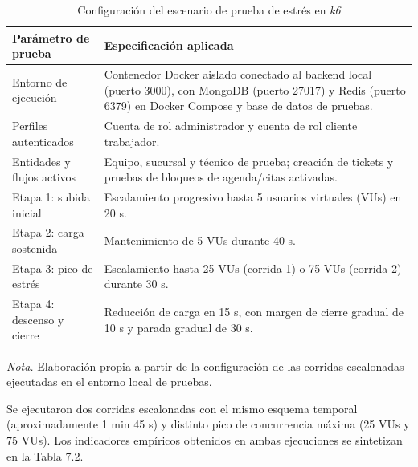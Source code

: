 \begin{table}[htbp]
\centering
\caption{Configuración del escenario de prueba de estrés en \textit{k6}}
\label{tab:config-k6}
\begin{tabularx}{\textwidth}{>{\raggedright\arraybackslash}p{4.2cm} X}
\toprule
\textbf{Parámetro de prueba} & \textbf{Especificación aplicada} \\
\midrule
Entorno de ejecución & Contenedor Docker aislado conectado al backend local (puerto 3000), con MongoDB (puerto 27017) y Redis (puerto 6379) en Docker Compose y base de datos de pruebas. \\
Perfiles autenticados & Cuenta de rol administrador y cuenta de rol cliente trabajador. \\
Entidades y flujos activos & Equipo, sucursal y técnico de prueba; creación de tickets y pruebas de bloqueos de agenda/citas activadas. \\
Etapa 1: subida inicial & Escalamiento progresivo hasta 5 usuarios virtuales (VUs) en 20 s. \\
Etapa 2: carga sostenida & Mantenimiento de 5 VUs durante 40 s. \\
Etapa 3: pico de estrés & Escalamiento hasta 25 VUs (corrida 1) o 75 VUs (corrida 2) durante 30 s. \\
Etapa 4: descenso y cierre & Reducción de carga en 15 s, con margen de cierre gradual de 10 s y parada gradual de 30 s. \\
\bottomrule
\end{tabularx}
\par\vspace{0.3em}
\raggedright\footnotesize{\textit{Nota.} Elaboración propia a partir de la configuración de las corridas escalonadas ejecutadas en el entorno local de pruebas.}
\end{table}

Se ejecutaron dos corridas escalonadas con el mismo esquema temporal (aproximadamente 1 min 45 s) y distinto pico de concurrencia máxima (25 VUs y 75 VUs). Los indicadores empíricos obtenidos en ambas ejecuciones se sintetizan en la Tabla 7.2.

